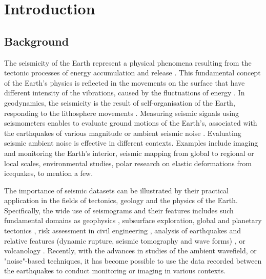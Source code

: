 \documentclass[informatics,article,submit,moreauthors,pdftex]{Definitions/mdpi}
\begin{document}

\section{Introduction}

\subsection{Background}
The seismicity of the Earth represent a physical phenomena resulting from the tectonic processes of energy accumulation and release \cite{GutenbergRichter}. This fundamental concept of the Earth's physics is reflected in the movements on the surface that have different intensity of the vibrations, caused by the fluctuations of energy \cite{Shearer2019}. In geodynamics, the seismicity is the result of self-organisation of the Earth, responding to the lithosphere movements \cite{UdiasBuforn2017}. Measuring seismic signals using seismometers enables to evaluate ground motions of the Earth’s, associated with the earthquakes of various magnitude or ambient seismic noise \cite{nakata_gualtieri_fichtner_2019}. Evaluating seismic ambient noise is effective in different contexts. Examples include imaging and monitoring the Earth’s interior, seismic mapping from global to regional or local scales, environmental studies, polar research on elastic deformations from icequakes, to mention a few.

The importance of seismic datasets can be illustrated by their practical application in the fields of tectonics, geology and the physics of the Earth. Specifically, the wide use of seismograms and their features \cite{Ammon2021} includes such fundamental domains as geophysics \cite{Kulhanek}, subsurface exploration, global and planetary tectonics \citep{Crampin,Jackson2002,Leroyetal2010}, risk assessment in civil engineering \citep{Phillips,Pileckietal2017, Kurzeja}, analysis of earthquakes and relative features (dynamic rupture, seismic tomography and wave forms) \cite{Ahorner,Steinmann,Amorese,Lomnitz,Yuliatmoko}, or volcanology \cite{Pezzo}. Recently, with the advances in studies of the ambient wavefield, or "noise"-based techniques, it has become possible to use the data recorded between the earthquakes to conduct monitoring \cite{Ratdomopurbo,Mordret} or imaging \cite{brenguier2014mapping,Lemenkova202012,Braszusetal2021,Lemenkova202016,Lietal2000} in various contexts. 
\end{document}

